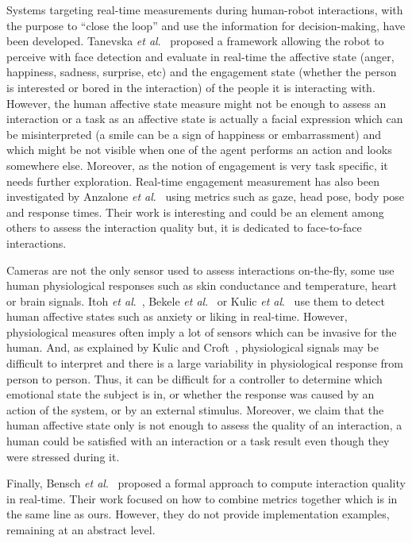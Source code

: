 \documentclass[a4paper,11pt,twoside]{StyleThese}
\begin{document}
Systems targeting real-time measurements during human-robot interactions, with the purpose to ``close the loop'' and use the information for decision-making, have been developed. Tanevska \textit{et al}.~\cite{tanevska:hal-01615491} proposed a framework allowing the robot to perceive with face detection and evaluate in real-time the affective state (\ie anger, happiness, sadness, surprise, etc) and the engagement state (\ie whether the person is interested or bored in the interaction) of the people it is interacting with. However, the human affective state measure might not be enough to assess an interaction or a task as an affective state is actually a facial expression which can be misinterpreted (\eg a smile can be a sign of happiness or embarrassment) and which might be not visible when one of the agent performs an action and looks somewhere else. Moreover, as the notion of engagement is very task specific, it needs further exploration. Real-time engagement measurement has also been investigated by Anzalone \textit{et al}.~\cite{anzalone_2015_evaluating} using metrics such as gaze, head pose, body pose and response times. Their work is interesting and could be an element among others to assess the interaction quality but, it is dedicated to face-to-face interactions. 

Cameras are not the only sensor used to assess interactions on-the-fly, some use human physiological responses such as skin conductance and temperature, heart or brain signals. Itoh \textit{et al}.~\cite{itoh2006}, Bekele \textit{et al}.~\cite{bekele_2014} or Kulic \textit{et al}.~\cite{kulic2007} use them to detect human affective states such as anxiety or liking in real-time. However, physiological measures often imply a lot of sensors which can be invasive for the human. And, as explained by Kulic and Croft~\cite{kulic_2003_estimating}, physiological signals may be difficult to interpret and there is a large variability in physiological response from person to person. Thus, it can be difficult for a controller to determine which emotional state the subject is in, or whether the response was caused by an action of the system, or by an external stimulus. Moreover, we claim that the human affective state only is not enough to assess the quality of an interaction, a human could be satisfied with an interaction or a task result even though they were stressed during it.

Finally,  Bensch \textit{et al}.~\cite{bensch17} proposed a formal approach to compute interaction quality in real-time. Their work focused on how to combine metrics together which is in the same line as ours. However, they do not provide implementation examples, remaining at an abstract level.
\end{document}
